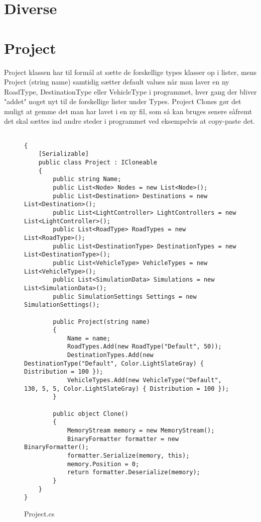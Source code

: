 \section{Diverse}\label{Diverse}

\section{Project}

Project klassen har til formål at sætte de forskellige types klasser op i lister, mens Project (string name) samtidig sætter default values når man laver en ny RoadType, DestinationType eller VehicleType i programmet, hver gang der bliver "addet" noget nyt til de forskellige lister under Types. Project Clones gør det muligt at gemme det man har lavet i en ny fil, som så kan bruges senere såfremt det skal sættes ind andre steder i programmet ved eksempelvis at copy-paste det.

\begin{figure}[H]
\begin{lstlisting} 

{ 
    [Serializable]
    public class Project : ICloneable
    {
        public string Name;
        public List<Node> Nodes = new List<Node>();
        public List<Destination> Destinations = new List<Destination>();
        public List<LightController> LightControllers = new List<LightController>();
        public List<RoadType> RoadTypes = new List<RoadType>();
        public List<DestinationType> DestinationTypes = new List<DestinationType>();
        public List<VehicleType> VehicleTypes = new List<VehicleType>();
        public List<SimulationData> Simulations = new List<SimulationData>();
        public SimulationSettings Settings = new SimulationSettings();
        
        public Project(string name)
        {
            Name = name;
            RoadTypes.Add(new RoadType("Default", 50));
            DestinationTypes.Add(new DestinationType("Default", Color.LightSlateGray) { Distribution = 100 });
            VehicleTypes.Add(new VehicleType("Default", 130, 5, 5, Color.LightSlateGray) { Distribution = 100 });
        }

        public object Clone()
        {
            MemoryStream memory = new MemoryStream();
            BinaryFormatter formatter = new BinaryFormatter();
            formatter.Serialize(memory, this);
            memory.Position = 0;
            return formatter.Deserialize(memory);
        }
    }
}
\end{lstlisting}
\caption{Project.cs}\label{Project}
\end{figure}


